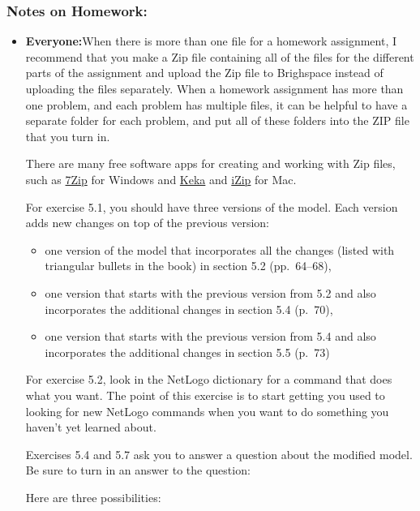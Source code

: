 \documentclass[
]{article}
\providecommand{\tightlist}{%
  \setlength{\itemsep}{0pt}\setlength{\parskip}{0pt}}
\begin{document}
\hypertarget{notes-on-homework-2}{%
\subsubsection{Notes on Homework:}\label{notes-on-homework-2}}

\begin{itemize}
\item
  \textbf{Everyone:}When there is more than one file for a homework
  assignment, I recommend that you make a Zip file containing all of the
  files for the different parts of the assignment and upload the Zip
  file to Brighspace instead of uploading the files separately. When a
  homework assignment has more than one problem, and each problem has
  multiple files, it can be helpful to have a separate folder for each
  problem, and put all of these folders into the ZIP file that you turn
  in.

  There are many free software apps for creating and working with Zip
  files, such as \href{https://www.7-zip.org/}{7Zip} for Windows and
  \href{https://www.keka.io/en/}{Keka} and
  \href{https://www.izip.com}{iZip} for Mac.

  For exercise 5.1, you should have three versions of the model. Each
  version adds new changes on top of the previous version:

  \begin{itemize}
  \tightlist
  \item
    one version of the model that incorporates all the changes (listed
    with triangular bullets in the book) in section 5.2 (pp.~64--68),
  \item
    one version that starts with the previous version from 5.2 and also
    incorporates the additional changes in section 5.4 (p.~70),
  \item
    one version that starts with the previous version from 5.4 and also
    incorporates the additional changes in section 5.5 (p.~73)
  \end{itemize}

  For exercise 5.2, look in the NetLogo dictionary for a command that
  does what you want. The point of this exercise is to start getting you
  used to looking for new NetLogo commands when you want to do something
  you haven't yet learned about.

  Exercises 5.4 and 5.7 ask you to answer a question about the modified
  model. Be sure to turn in an answer to the question:

  Here are three possibilities:


\end{itemize}
\end{document}
